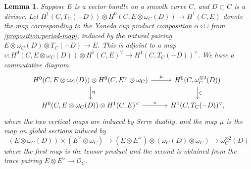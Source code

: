 \documentclass[12 pt]{amsart}
\theoremstyle{plain}
\newtheorem{lemma}[subsubsection]{Lemma}
\theoremstyle{definition}
\theoremstyle{remark}
\numberwithin{equation}{section}
\begin{document}
\begin{lemma}
	\label{lemma:multiplication-map}
	Suppose $E$ is a vector bundle on a smooth curve $C$, and $D \subset C$
	is a divisor.
	Let $H^1(C, T_C(-D)) \otimes H^0(C, E \otimes \omega_C(D)) \to H^1(C, E)$
	denote the map corresponding to the Yoneda cup product composition $\alpha \circ \cup$ 
	from \autoref{proposition:period-map},
	induced by the natural pairing $E \otimes \omega_C(D) \otimes T_C(-D) \to E$.
This is adjoint to a map $\upsilon: H^0(C, E \otimes \omega_C(D)) \otimes
	H^1(C, E)^\vee \to H^1(C, T_C(-D))^\vee$.
	We have a commutative diagram
	\begin{equation}
		\label{equation:serre-dual-diagram}
		\begin{tikzcd} 
			H^0(C, E \otimes \omega_C(D)) \otimes H^0(C, E^\vee \otimes
			\omega_C)  \ar {r}{\mu}\ar{d}{\eta}  & H^0(C, \omega_C^{\otimes 2}(D))\ar{d}{\zeta}
\\
H^0(C, E \otimes \omega_C(D)) \otimes H^1(C, E)^\vee \ar
			{r}{\upsilon} & H^1(C, T_C(-D))^\vee ,
				\end{tikzcd}\end{equation}
	where the two vertical maps are induced by Serre duality, and the 
	map $\mu$ is the map on global sections induced by $$(E
	\otimes \omega_C(D)) \times (E^\vee \otimes \omega_C) \to (E \otimes E^\vee)
	\otimes (\omega_C(D) \otimes \omega_C) \to \omega_C^{\otimes 2}(D)$$
	where the first map is the tensor product and the second is obtained from the trace pairing $E\otimes E^\vee\to \mathscr{O}_C$.
\end{lemma}
\end{document}
